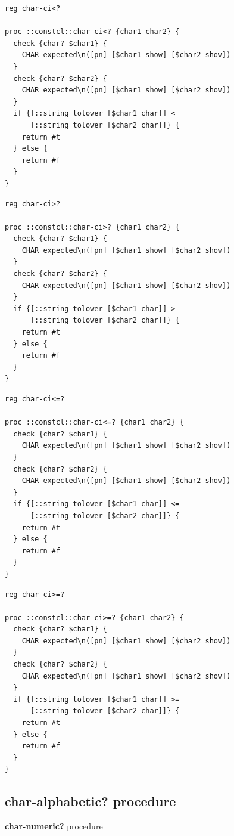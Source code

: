 \documentclass[twoside]{report}
\begin{document}
\begin{lstlisting}
reg char-ci<?

proc ::constcl::char-ci<? {char1 char2} {
  check {char? $char1} {
    CHAR expected\n([pn] [$char1 show] [$char2 show])
  }
  check {char? $char2} {
    CHAR expected\n([pn] [$char1 show] [$char2 show])
  }
  if {[::string tolower [$char1 char]] <
      [::string tolower [$char2 char]]} {
    return #t
  } else {
    return #f
  }
}
\end{lstlisting}

\begin{lstlisting}
reg char-ci>?

proc ::constcl::char-ci>? {char1 char2} {
  check {char? $char1} {
    CHAR expected\n([pn] [$char1 show] [$char2 show])
  }
  check {char? $char2} {
    CHAR expected\n([pn] [$char1 show] [$char2 show])
  }
  if {[::string tolower [$char1 char]] >
      [::string tolower [$char2 char]]} {
    return #t
  } else {
    return #f
  }
}
\end{lstlisting}

\begin{lstlisting}
reg char-ci<=?

proc ::constcl::char-ci<=? {char1 char2} {
  check {char? $char1} {
    CHAR expected\n([pn] [$char1 show] [$char2 show])
  }
  check {char? $char2} {
    CHAR expected\n([pn] [$char1 show] [$char2 show])
  }
  if {[::string tolower [$char1 char]] <=
      [::string tolower [$char2 char]]} {
    return #t
  } else {
    return #f
  }
}
\end{lstlisting}

\begin{lstlisting}
reg char-ci>=?

proc ::constcl::char-ci>=? {char1 char2} {
  check {char? $char1} {
    CHAR expected\n([pn] [$char1 show] [$char2 show])
  }
  check {char? $char2} {
    CHAR expected\n([pn] [$char1 show] [$char2 show])
  }
  if {[::string tolower [$char1 char]] >=
      [::string tolower [$char2 char]]} {
    return #t
  } else {
    return #f
  }
}
\end{lstlisting}

\subsection{char-alphabetic? procedure}
\label{charalphabetic-procedure}

\noindent \textbf{char-numeric?} procedure
\end{document}

